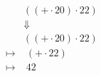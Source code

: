 \documentclass{article}
\begin{document}
\tiny\begin{align*}
&\left(\left(+\cdot 20\right)\cdot 22\right)\\ 
&\Downarrow\\ 
&\left(\left(\mathtt{+}\cdot 20\right)\cdot 22\right)\\ 
\longmapsto &\;\left(\mathtt{+}\cdot 22\right)\\ 
\longmapsto &\;42\\ 
\end{align*}
\end{document}
